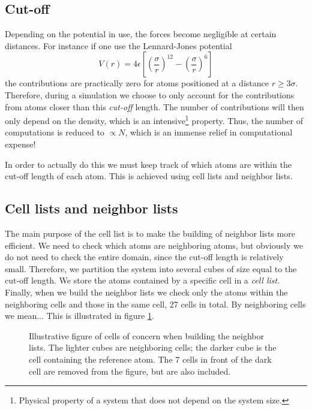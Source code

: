 \documentclass[twoside,english]{uiofysmaster}
\begin{document}
\subsection{Cut-off}
Depending on the potential in use, the forces become negligible at certain distances. 
For instance if one use the Lennard-Jones potential
\begin{equation}
V(r)= 4 \epsilon \left [ {\left (\dfrac{\sigma}{r} \right )}^{12}-{\left (\dfrac{\sigma}{r} \right )}^{6}  \right] \label{eq: LJ-potential}
\end{equation}
the contributions are practically zero for atoms positioned at a distance $r\geq3\sigma$.
Therefore, during a simulation we choose to only account for the contributions from atoms closer than this \textit{cut-off} length.  
The number of contributions will then only depend on the density, which is an intensive\footnote{Physical property of a system that does not depend on the system size.} property. Thus, the number of computations is reduced to $\propto N$, which is an immense relief in computational expense!

In order to actually do this we must keep track of which atoms are within the cut-off length of each atom. 
This is achieved using cell lists and neighbor lists. 

\subsection{Cell lists and neighbor lists}
The main purpose of the cell list is to make the building of neighbor lists more efficient. 
We need to check which atoms are neighboring atoms, but obviously we do not need to check the entire domain, since the cut-off length is relatively small. Therefore, we partition the system into several cubes of size equal to the cut-off length. We store the atoms contained by a specific cell in a \textit{cell list}. Finally, when we build the neighbor lists we check only the atoms within the neighboring cells and those in the same cell, 27 cells in total. {\large {\color{editColor} By neighboring cells we mean...}} This is illustrated in figure \ref{fig:neighbourcells}.

\begin{figure}
	\center
	\resizebox{0.45\linewidth}{!}{
	
	}
	\caption{Illustrative figure of cells of concern when building the neighbor lists. The lighter cubes are neighboring cells; the darker cube is the cell containing the reference atom. The 7 cells in front of the dark cell are removed from the figure, but are also included. }
	\label{fig:neighbourcells}
\end{figure}
\end{document}
